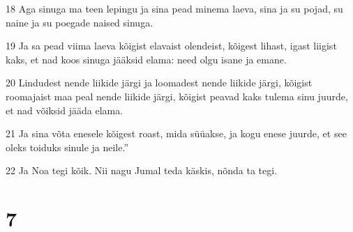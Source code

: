 \par 18 Aga sinuga ma teen lepingu ja sina pead minema laeva, sina ja su pojad, su naine ja su poegade naised sinuga.
\par 19 Ja sa pead viima laeva kõigist elavaist olendeist, kõigest lihast, igast liigist kaks, et nad koos sinuga jääksid elama: need olgu isane ja emane.
\par 20 Lindudest nende liikide järgi ja loomadest nende liikide järgi, kõigist roomajaist maa peal nende liikide järgi, kõigist peavad kaks tulema sinu juurde, et nad võiksid jääda elama.
\par 21 Ja sina võta enesele kõigest roast, mida süüakse, ja kogu enese juurde, et see oleks toiduks sinule ja neile.”
\par 22 Ja Noa tegi kõik. Nii nagu Jumal teda käskis, nõnda ta tegi.

\chapter{7}

